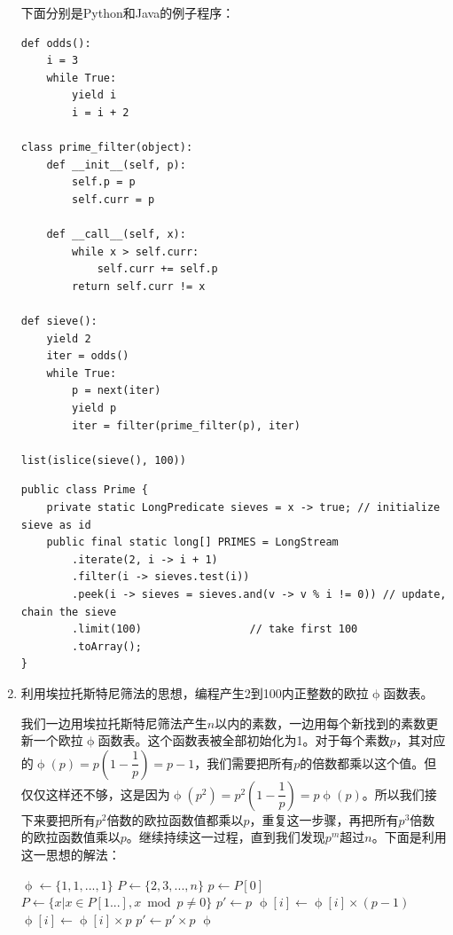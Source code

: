 \documentclass[UTF8]{article}
\begin{document}
\begin{enumerate}
下面分别是Python和Java的例子程序：
\lstset{language=Python}
\begin{lstlisting}
def odds():
    i = 3
    while True:
        yield i
        i = i + 2

class prime_filter(object):
    def __init__(self, p):
        self.p = p
        self.curr = p

    def __call__(self, x):
        while x > self.curr:
            self.curr += self.p
        return self.curr != x

def sieve():
    yield 2
    iter = odds()
    while True:
        p = next(iter)
        yield p
        iter = filter(prime_filter(p), iter)

list(islice(sieve(), 100))
\end{lstlisting}

\lstset{language=Java}
\begin{lstlisting}
public class Prime {
    private static LongPredicate sieves = x -> true; // initialize sieve as id
    public final static long[] PRIMES = LongStream
        .iterate(2, i -> i + 1)
        .filter(i -> sieves.test(i))
        .peek(i -> sieves = sieves.and(v -> v % i != 0)) // update, chain the sieve
        .limit(100)                 // take first 100
        .toArray();
}
\end{lstlisting}

\item 利用埃拉托斯特尼筛法的思想，编程产生2到100内正整数的欧拉$\upphi$函数表。

我们一边用埃拉托斯特尼筛法产生$n$以内的素数，一边用每个新找到的素数更新一个欧拉$\upphi$函数表。这个函数表被全部初始化为1。对于每个素数$p$，其对应的$\upphi(p) = p(1 - \dfrac{1}{p}) = p - 1$，我们需要把所有$p$的倍数都乘以这个值。但仅仅这样还不够，这是因为$\upphi(p^2) = p^2(1 - \dfrac{1}{p}) = p \upphi(p)$。所以我们接下来要把所有$p^2$倍数的欧拉函数值都乘以$p$，重复这一步骤，再把所有$p^3$倍数的欧拉函数值乘以$p$。继续持续这一过程，直到我们发现$p^m$超过$n$。下面是利用这一思想的解法：

\begin{algorithmic}
  \State $\upphi \gets \{1, 1, ..., 1\}$ 
  \State $P \gets \{2, 3, ..., n\}$ 
    \State $p \gets P[0]$
    \State $P \gets \{x | x \in P[1...], x \bmod p \neq 0\}$
    \State $p' \gets p$
    \Repeat
          \State $\upphi[i] \gets \upphi[i] \times (p - 1)$
        \Else
          \State $\upphi[i] \gets \upphi[i] \times p$
        \EndIf
      \EndFor
      \State $p' \gets p' \times p$
  \EndWhile
  \State \Return $\upphi$
\EndFunction
\end{algorithmic}


\end{enumerate}
\end{document}
